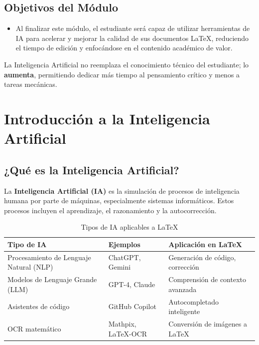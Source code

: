 \documentclass[11pt,letterpaper]{article}
\begin{document}
\subsection*{Objetivos del Módulo}

\begin{itemize}
	\item Al finalizar este módulo, el estudiante será capaz de utilizar herramientas de IA para acelerar y mejorar la calidad de sus documentos \LaTeX, reduciendo el tiempo de edición y enfocándose en el contenido académico de valor.
\end{itemize}

\begin{ia}
	La Inteligencia Artificial no reemplaza el conocimiento técnico del estudiante; lo \textbf{aumenta}, permitiendo dedicar más tiempo al pensamiento crítico y menos a tareas mecánicas.
\end{ia}

\newpage


\section{Introducción a la Inteligencia Artificial}

\subsection{¿Qué es la Inteligencia Artificial?}

La \textbf{Inteligencia Artificial (IA)} es la simulación de procesos de inteligencia humana por parte de máquinas, especialmente sistemas informáticos. Estos procesos incluyen el aprendizaje, el razonamiento y la autocorrección.

\begin{table}[H]
	\centering
	\begin{tabular}{@{}lll@{}}
		\toprule
		\textbf{Tipo de IA} & \textbf{Ejemplos} & \textbf{Aplicación en \LaTeX} \\
		\midrule
		Procesamiento de Lenguaje Natural (NLP) & ChatGPT, Gemini & Generación de código, corrección \\
		Modelos de Lenguaje Grande (LLM) & GPT-4, Claude & Comprensión de contexto avanzada \\
		Asistentes de código & GitHub Copilot & Autocompletado inteligente \\
		OCR matemático & Mathpix, LaTeX-OCR & Conversión de imágenes a \LaTeX \\
		\bottomrule
	\end{tabular}
	\caption{Tipos de IA aplicables a \LaTeX}
	\label{tab:tiposia}
\end{table}
\end{document}
